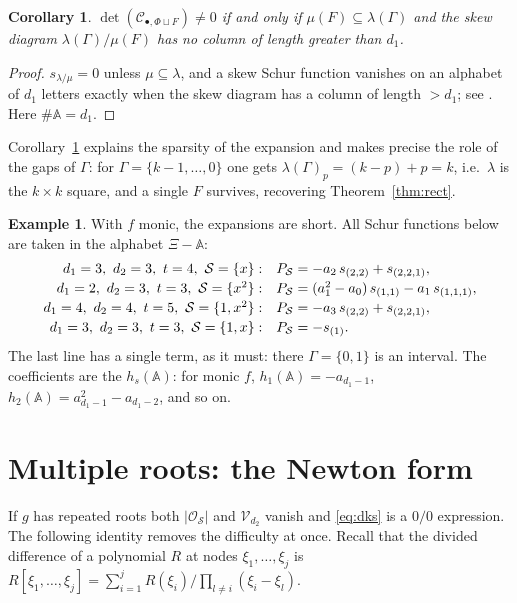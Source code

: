 \documentclass[11pt,reqno]{amsart}
\theoremstyle{plain}
\newtheorem{corollary}[theorem]{Corollary}
\theoremstyle{definition}
\newtheorem{example}[theorem]{Example}
\newcommand{\bA}{\mathbb{A}}
\newcommand{\bX}{\Xi}
\newcommand{\cO}{\mathcal{O}}
\newcommand{\cS}{\mathcal{S}}
\newcommand{\cV}{\mathcal{V}}
\newcommand{\cC}{\mathcal{C}}
\begin{document}
\begin{corollary}\label{cor:support}
$\det(\cC_{\bullet,\Phi\sqcup F})\neq0$ if and only if
$\mu(F)\subseteq\lambda(\Gamma)$ and the skew diagram
$\lambda(\Gamma)/\mu(F)$ has no column of length greater than $d_1$.
\end{corollary}

\begin{proof}
$s_{\lambda/\mu}=0$ unless $\mu\subseteq\lambda$, and a skew Schur function
vanishes on an alphabet of $d_1$ letters exactly when the skew diagram has a
column of length $>d_1$; see \cite[I.5]{Macdonald}. Here $\#\bA=d_1$.
\end{proof}

Corollary~\ref{cor:support} explains the sparsity of the expansion and makes
precise the role of the gaps of $\Gamma$: for $\Gamma=\{k-1,\dots,0\}$ one gets
$\lambda(\Gamma)_p=(k-p)+p=k$, i.e.\ $\lambda$ is the $k\times k$ square, and a
single $F$ survives, recovering Theorem~\ref{thm:rect}.

\begin{example}
With $f$ monic, the expansions are short. All Schur functions below are taken in
the alphabet $\bX-\bA$:
\[
\begin{array}{r@{\quad}l}
  d_1=3,\ d_2=3,\ t=4,\ \cS=\{x\}:      & P_\cS=-a_2\,s_{(2,2)}+s_{(2,2,1)},\\[2pt]
  d_1=2,\ d_2=3,\ t=3,\ \cS=\{x^2\}:    & P_\cS=(a_1^2-a_0)\,s_{(1,1)}-a_1\,s_{(1,1,1)},\\[2pt]
  d_1=4,\ d_2=4,\ t=5,\ \cS=\{1,x^2\}:  & P_\cS=-a_3\,s_{(2,2)}+s_{(2,2,1)},\\[2pt]
  d_1=3,\ d_2=3,\ t=3,\ \cS=\{1,x\}:    & P_\cS=-s_{(1)} .
\end{array}
\]
The last line has a single term, as it must: there $\Gamma=\{0,1\}$ is an
interval. The coefficients are the $h_s(\bA)$: for monic $f$,
$h_1(\bA)=-a_{d_1-1}$, $h_2(\bA)=a_{d_1-1}^2-a_{d_1-2}$, and so on.
\end{example}

\section{Multiple roots: the Newton form}\label{sec:newton}

If $g$ has repeated roots both $|\cO_\cS|$ and $\cV_{d_2}$ vanish and
\eqref{eq:dks} is a $0/0$ expression. The following identity removes the
difficulty at once. Recall that the divided difference of a polynomial $R$ at
nodes $\xi_1,\dots,\xi_j$ is
$R[\xi_1,\dots,\xi_j]=\sum_{i=1}^{j}R(\xi_i)\big/\prod_{l\ne i}(\xi_i-\xi_l)$.
\end{document}

